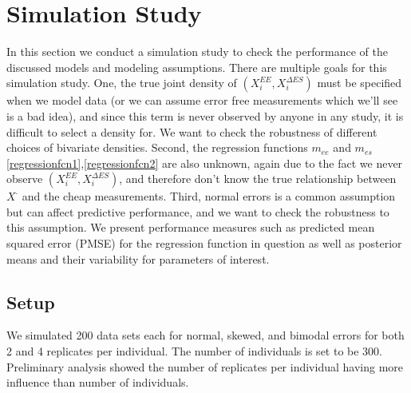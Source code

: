 \documentclass[11pt]{article}\usepackage[]{graphicx}\usepackage[]{color}
\begin{document}
\section{Simulation Study}

In this section we conduct a simulation study to check the performance of the discussed models and modeling assumptions. There are multiple goals for this simulation study. One, the true joint density of $(X_i^{EE},X_i^{\Delta ES})$ must be specified when we model data (or we can assume error free measurements which we'll see is a bad idea), and since this term is never observed by anyone in any study, it is difficult to select a density for. We want to check the robustness of different choices of bivariate densities. Second, the regression functions $m_{ee}$ and $m_{es}$ \eqref{regressionfcn1},\eqref{regressionfcn2} are also unknown, again due to the fact we never observe $(X_i^{EE},X_i^{\Delta ES})$, and therefore don't know the true relationship between $X^{\cdot}$ and the cheap measurements. Third, normal errors  is a common assumption but  can affect predictive performance, and we want to check the robustness to this assumption. We present performance measures such as predicted mean squared error (PMSE) for the regression function in question as well as posterior means and their variability for parameters of interest. 


\subsection{Setup}

We simulated 200 data sets each for normal, skewed, and bimodal errors for both 2 and 4 replicates per individual. The number of individuals is set to be 300. Preliminary analysis showed the number of replicates per individual having  more influence than number of individuals. 
\end{document}
